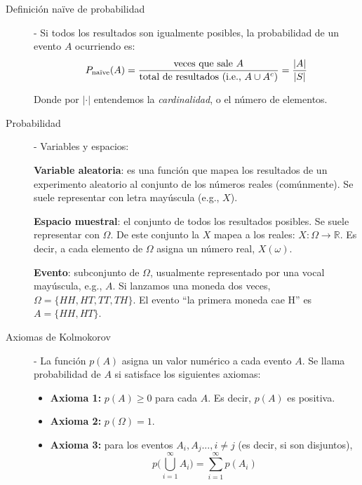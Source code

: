 \documentclass[12pt]{scrartcl}
\theoremstyle{definition}
\begin{document}
\begin{description}
	
	
	\item[Definición naïve de probabilidad] - {Si todos los resultados son igualmente posibles}, la probabilidad de un evento $A$ ocurriendo es:
	\[P_{\textrm{naïve}}(A) = \frac{\textnormal{veces que sale $A$}}{\textnormal{total de resultados (i.e., $A \cup A^c$})} = \frac{|A|}{|S|}\]
	
	Donde por $|\cdot|$ entendemos la \textit{cardinalidad}, o el número de elementos. 
	\item[Probabilidad] - Variables y espacios:
	
		\textbf{Variable aleatoria}: es una función que mapea los resultados de un experimento aleatorio al conjunto de los números reales (comúnmente). Se suele representar con letra mayúscula (e.g., $X$).

		\textbf{Espacio muestral}: el conjunto de todos los resultados posibles. Se suele representar con $\Omega$. De este conjunto la $X$ mapea a los reales: $X: \Omega \rightarrow \mathbb{R}$. Es decir, a cada elemento de $\Omega$ asigna un número real, $X(\omega)$.

		\textbf{Evento}: subconjunto de $\Omega$, usualmente representado por una vocal mayúscula, e.g., $A$. Si lanzamos una moneda dos veces, $\Omega = \{HH,HT,TT,TH\}$. El evento ``la primera moneda cae H'' es $A=\{HH,HT\}$. 

		\item[Axiomas de Kolmokorov] - La función $p(A)$ asigna un valor numérico a cada evento $A$. Se llama probabilidad de $A$ si satisface los siguientes axiomas:
		\begin{itemize}
			\item \textbf{Axioma 1:} $p(A) \geq 0$ para cada $A$. Es decir, $p(A)$ es positiva.
			\item \textbf{Axioma 2:} $p(\Omega) = 1$.
			\item \textbf{Axioma 3:} para los eventos $A_i,A_j..., i \neq j$ (es decir, si son disjuntos), 
			\[p\Bigg (\bigcup^\infty_{i=1} A_i \Bigg) = \sum_{i=1}^{\infty} p(A_i)\]
		\end{itemize}
	

\end{description}
\end{document}
